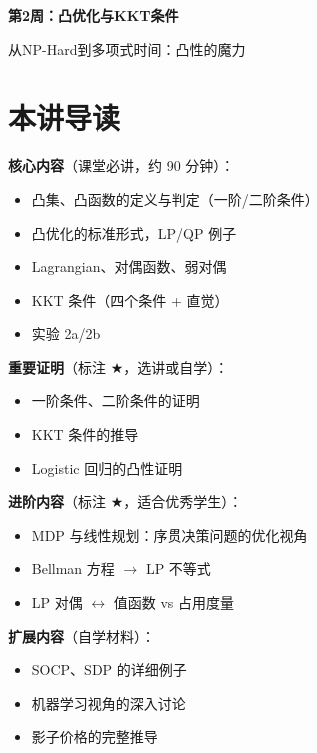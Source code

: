 \documentclass[12pt, a4paper]{ctexart}
\begin{document}
\begin{center}
{\LARGE\bfseries 第2周：凸优化与KKT条件}

\vspace{0.5cm}
{\large 从NP-Hard到多项式时间：凸性的魔力}
\end{center}

\tableofcontents
\newpage

\section*{本讲导读}

\begin{blackboard}[内容层次]

\textbf{核心内容}（课堂必讲，约 90 分钟）：
\begin{itemize}
    \item 凸集、凸函数的定义与判定（一阶/二阶条件）
    \item 凸优化的标准形式，LP/QP 例子
    \item Lagrangian、对偶函数、弱对偶
    \item KKT 条件（四个条件 + 直觉）
    \item 实验 2a/2b
\end{itemize}

\textbf{重要证明}（标注 $\bigstar$，选讲或自学）：
\begin{itemize}
    \item 一阶条件、二阶条件的证明
    \item KKT 条件的推导
    \item Logistic 回归的凸性证明
\end{itemize}

\textbf{进阶内容}（标注 $\bigstar$，适合优秀学生）：
\begin{itemize}
    \item MDP 与线性规划：序贯决策问题的优化视角
    \item Bellman 方程 $\to$ LP 不等式
    \item LP 对偶 $\leftrightarrow$ 值函数 vs 占用度量
\end{itemize}

\textbf{扩展内容}（自学材料）：
\begin{itemize}
    \item SOCP、SDP 的详细例子
    \item 机器学习视角的深入讨论
    \item 影子价格的完整推导
\end{itemize}

\end{blackboard}
\end{document}
